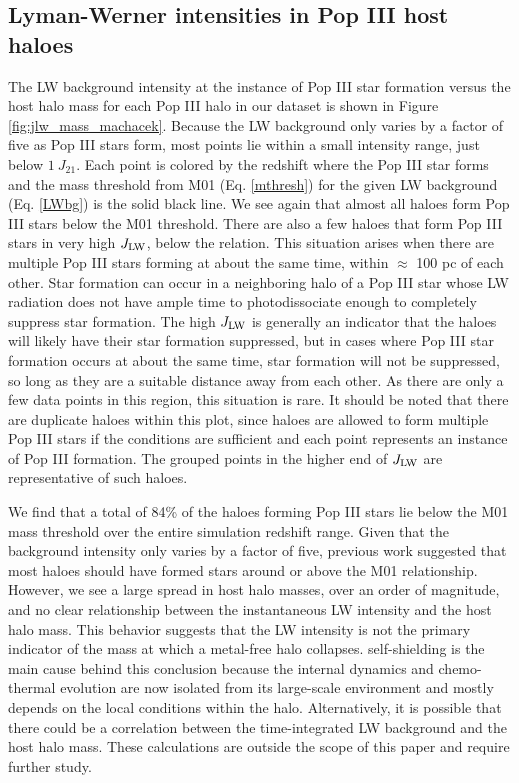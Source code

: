 \documentclass[fleqn,usenatbib]{mnras}
\begin{document}
\subsection{Lyman-Werner intensities in Pop III host haloes}

The LW background intensity at the instance of Pop III star formation versus the host halo mass for each Pop III halo in our dataset is shown in Figure \ref{fig:jlw_mass_machacek}. Because the LW background only varies by a factor of five as Pop III stars form, most points lie within a small intensity range, just below $1~J_{21}$. Each point is colored by the redshift where the Pop III star forms and the mass threshold from M01 (Eq. \ref{mthresh}) for the given LW background (Eq. \ref{LWbg}) is the solid black line. We see again that almost all haloes form Pop III stars below the M01 threshold. There are also a few haloes that form Pop III stars in very high $J_{\rm LW}$, below the relation. This situation arises when there are multiple Pop III stars forming at about the same time, within $\approx$ 100 pc of each other. Star formation can occur in a neighboring halo of a Pop III star whose LW radiation does not have ample time to photodissociate enough \hh{} to completely suppress star formation. The high $J_{\rm LW}$ is generally an indicator that the haloes will likely have their star formation suppressed, but in cases where Pop III star formation occurs at about the same time, star formation will not be suppressed, so long as they are a suitable distance away from each other. As there are only a few data points in this region, this situation is rare. It should be noted that there are duplicate haloes within this plot, since haloes are allowed to form multiple Pop III stars if the conditions are sufficient and each point represents an instance of Pop III formation. The grouped points in the higher end of $J_{\rm LW}$ are representative of such haloes. 

We find that a total of 84\% of the haloes forming Pop III stars lie below the M01 mass threshold over the entire simulation redshift range.  Given that the background intensity only varies by a factor of five, previous work suggested that most haloes should have formed stars around or above the M01 relationship.  However, we see a large spread in host halo masses, over an order of magnitude, and no clear relationship between the instantaneous LW intensity and the host halo mass. This behavior suggests that the LW intensity is not the primary indicator of the mass at which a metal-free halo collapses. \hh{} self-shielding is the main cause behind this conclusion because the internal dynamics and chemo-thermal evolution are now isolated from its large-scale environment and mostly depends on the local conditions within the halo. Alternatively, it is possible that there could be a correlation between the time-integrated LW background and the host halo mass. These calculations are outside the scope of this paper and require further study.
\end{document}
